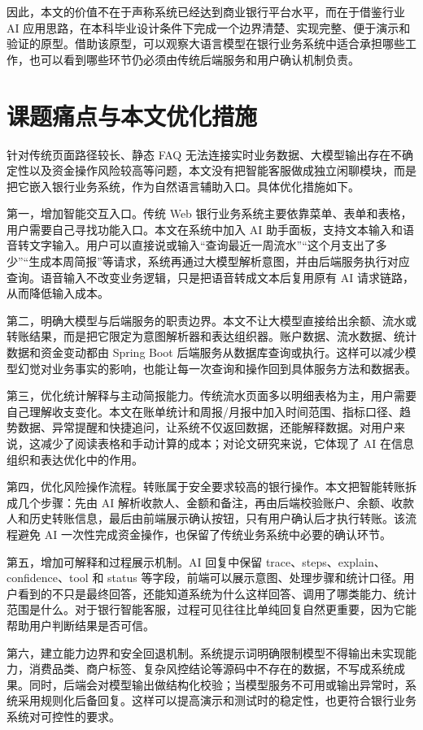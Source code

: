 \documentclass[bachelor, print]{xduthesis}
\begin{document}
因此，本文的价值不在于声称系统已经达到商业银行平台水平，而在于借鉴行业 AI 应用思路，在本科毕业设计条件下完成一个边界清楚、实现完整、便于演示和验证的原型。借助该原型，可以观察大语言模型在银行业务系统中适合承担哪些工作，也可以看到哪些环节仍必须由传统后端服务和用户确认机制负责。

\section{课题痛点与本文优化措施}

针对传统页面路径较长、静态 FAQ 无法连接实时业务数据、大模型输出存在不确定性以及资金操作风险较高等问题，本文没有把智能客服做成独立闲聊模块，而是把它嵌入银行业务系统，作为自然语言辅助入口。具体优化措施如下。

第一，增加智能交互入口。传统 Web 银行业务系统主要依靠菜单、表单和表格，用户需要自己寻找功能入口。本文在系统中加入 AI 助手面板，支持文本输入和语音转文字输入。用户可以直接说或输入“查询最近一周流水”“这个月支出了多少”“生成本周简报”等请求，系统再通过大模型解析意图，并由后端服务执行对应查询。语音输入不改变业务逻辑，只是把语音转成文本后复用原有 AI 请求链路，从而降低输入成本。

第二，明确大模型与后端服务的职责边界。本文不让大模型直接给出余额、流水或转账结果，而是把它限定为意图解析器和表达组织器。账户数据、流水数据、统计数据和资金变动都由 Spring Boot 后端服务从数据库查询或执行。这样可以减少模型幻觉对业务事实的影响，也能让每一次查询和操作回到具体服务方法和数据表。

第三，优化统计解释与主动简报能力。传统流水页面多以明细表格为主，用户需要自己理解收支变化。本文在账单统计和周报/月报中加入时间范围、指标口径、趋势数据、异常提醒和快捷追问，让系统不仅返回数据，还能解释数据。对用户来说，这减少了阅读表格和手动计算的成本；对论文研究来说，它体现了 AI 在信息组织和表达优化中的作用。

第四，优化风险操作流程。转账属于安全要求较高的银行操作。本文把智能转账拆成几个步骤：先由 AI 解析收款人、金额和备注，再由后端校验账户、余额、收款人和历史转账信息，最后由前端展示确认按钮，只有用户确认后才执行转账。该流程避免 AI 一次性完成资金操作，也保留了传统业务系统中必要的确认环节。

第五，增加可解释和过程展示机制。AI 回复中保留 trace、steps、explain、confidence、tool 和 status 等字段，前端可以展示意图、处理步骤和统计口径。用户看到的不只是最终回答，还能知道系统为什么这样回答、调用了哪类能力、统计范围是什么。对于银行智能客服，过程可见往往比单纯回复自然更重要，因为它能帮助用户判断结果是否可信。

第六，建立能力边界和安全回退机制。系统提示词明确限制模型不得输出未实现能力，消费品类、商户标签、复杂风控结论等源码中不存在的数据，不写成系统成果。同时，后端会对模型输出做结构化校验；当模型服务不可用或输出异常时，系统采用规则化后备回复。这样可以提高演示和测试时的稳定性，也更符合银行业务系统对可控性的要求。
\end{document}
